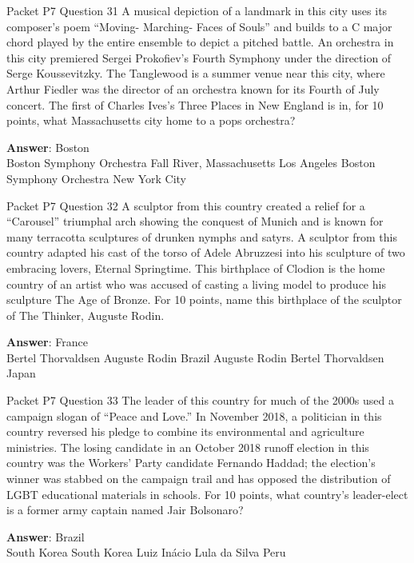 \begin{frame}{Packet P7 Question 31}
A musical depiction of a landmark in this city uses its composer’s poem “Moving- Marching- Faces of Souls” and builds to a C major chord played by the entire ensemble to depict a pitched battle. An orchestra in this city premiered Sergei Prokofiev’s Fourth Symphony under the direction of Serge Koussevitzky. The Tanglewood is a summer venue   near this city, where Arthur Fiedler was the director of an orchestra known for its Fourth of July concert. The first of Charles Ives’s Three Places in New England is in, for 10 points, what Massachusetts city home to a pops orchestra?        

\textbf{Answer}: Boston\\
 Boston Symphony Orchestra
 Fall River, Massachusetts
 Los Angeles
 Boston Symphony Orchestra
 New York City
\end{frame}

\begin{frame}{Packet P7 Question 32}
A sculptor from this country   created a relief for a “Carousel” triumphal arch showing the conquest of Munich and is known for many terracotta sculptures of drunken nymphs and satyrs. A sculptor from this country adapted his cast of the torso of Adele Abruzzesi into his sculpture of two embracing lovers, Eternal Springtime. This birthplace of Clodion is the home country of an artist who was accused of casting a living model   to produce his sculpture The Age of Bronze. For 10 points, name this birthplace of the sculptor of The Thinker, Auguste Rodin.        

\textbf{Answer}: France\\
 Bertel Thorvaldsen
 Auguste Rodin
 Brazil
 Auguste Rodin
 Bertel Thorvaldsen
 Japan
\end{frame}

\begin{frame}{Packet P7 Question 33}
The leader of this country for much of the 2000s used a campaign slogan of “Peace and Love.” In November 2018, a politician in this country reversed his pledge to combine its environmental and agriculture ministries. The losing candidate in an October 2018 runoff election in this country was the Workers’ Party candidate Fernando Haddad; the election’s winner was stabbed on the campaign trail and has opposed the distribution of LGBT educational materials in schools. For 10 points, what country’s leader-elect is a former army captain named Jair Bolsonaro?        

\textbf{Answer}: Brazil\\
 South Korea
 South Korea
 Luiz Inácio Lula da Silva
 Peru
\end{frame}

